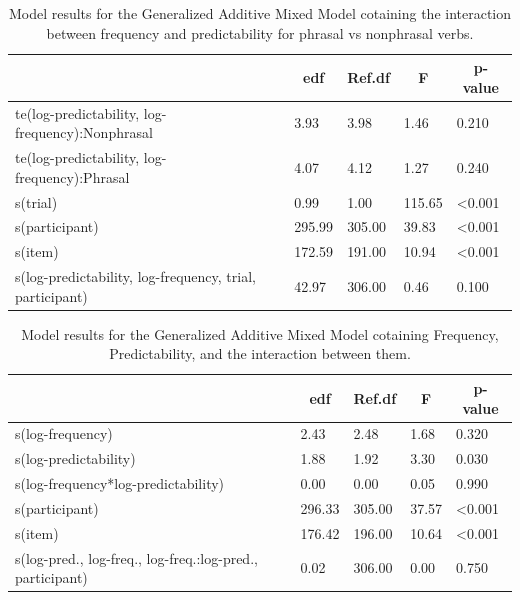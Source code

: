 \documentclass[
  man,floatsintext]{apa6}
\begin{document}
\begin{table}[H]

\begin{center}
\begin{threeparttable}

\caption{\label{tab:gamModelPhrasalNonPhrasalTab}Model results for the Generalized Additive Mixed Model cotaining the interaction between frequency and predictability for phrasal vs nonphrasal verbs.}

\begin{tabular}{lllll}
\toprule
 & \multicolumn{1}{c}{edf} & \multicolumn{1}{c}{Ref.df} & \multicolumn{1}{c}{F} & \multicolumn{1}{c}{p-value}\\
\midrule
te(log-predictability, log-frequency):Nonphrasal & 3.93 & 3.98 & 1.46 & 0.210\\
te(log-predictability, log-frequency):Phrasal & 4.07 & 4.12 & 1.27 & 0.240\\
s(trial) & 0.99 & 1.00 & 115.65 & <0.001\\
s(participant) & 295.99 & 305.00 & 39.83 & <0.001\\
s(item) & 172.59 & 191.00 & 10.94 & <0.001\\
s(log-predictability, log-frequency, trial, participant) & 42.97 & 306.00 & 0.46 & 0.100\\
\bottomrule
\end{tabular}

\end{threeparttable}
\end{center}

\end{table}

\begin{table}[H]

\begin{center}
\begin{threeparttable}

\caption{\label{tab:gamModelInterTab}Model results for the Generalized Additive Mixed Model cotaining Frequency, Predictability, and the interaction between them.}

\begin{tabular}{lllll}
\toprule
 & \multicolumn{1}{c}{edf} & \multicolumn{1}{c}{Ref.df} & \multicolumn{1}{c}{F} & \multicolumn{1}{c}{p-value}\\
\midrule
s(log-frequency) & 2.43 & 2.48 & 1.68 & 0.320\\
s(log-predictability) & 1.88 & 1.92 & 3.30 & 0.030\\
s(log-frequency*log-predictability) & 0.00 & 0.00 & 0.05 & 0.990\\
s(participant) & 296.33 & 305.00 & 37.57 & <0.001\\
s(item) & 176.42 & 196.00 & 10.64 & <0.001\\
s(log-pred., log-freq., log-freq.:log-pred., participant) & 0.02 & 306.00 & 0.00 & 0.750\\
\bottomrule
\end{tabular}

\end{threeparttable}
\end{center}

\end{table}
\end{document}
